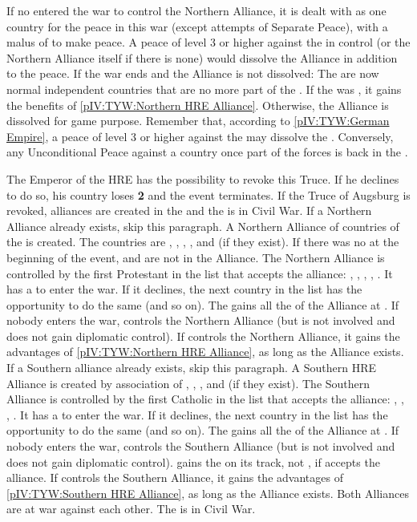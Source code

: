 \phpaix
\aparag If no \MAJ entered the war to control the Northern Alliance, it is
dealt with as one country for the peace in this war (except attempts of
Separate Peace), with a malus of  to make peace.
\aparag A peace of level 3 or higher against the \MAJ in control (or the
Northern Alliance itself if there is none) would dissolve the Alliance in
addition to the peace.
\aparag If the war ends and the Alliance is not dissolved:
\bparag The \MIN are now normal independent countries that are no more part of
the \GE.
\bparag If the \MAJ was \HOL, it gains the benefits of \ref{pIV:TYW:Northern
  HRE Alliance}. Otherwise, the Alliance is dissolved for game purpose.
\aparag Remember that, according to \ref{pIV:TYW:German Empire}, a peace of
level 3 or higher against the \MAJHAB may dissolve the \GE.  Conversely, any
Unconditional Peace against a country once part of the \GE forces is back in
the \GE.



\phevnt
\aparag The Emperor of the HRE has the possibility to revoke this Truce. If he
declines to do so, his country loses {\bf 2 \STAB} and the event terminates.
If the Truce of Augsburg is revoked, alliances are created in the \HRE and the
\HRE is in Civil War.
 If a Northern Alliance already exists, skip this
paragraph.
\bparag A Northern Alliance of countries of the \HRE is created.  The
countries are \paysOldenburg, \paysHanovre, \paysHesse, \paysHanse, and
\paysBerg (if they exist). If there was no  at the
beginning of the event,  and  are not in the Alliance.
\bparag The Northern Alliance is controlled by the first Protestant \MAJ in
the list that accepts the alliance: \HOL, \ENG, \SUE, \FRA, \POL.  It has a
\CB to enter the war. If it declines, the next country in the list has the
opportunity to do the same (and so on).  The \MAJ gains all the \MIN of the
Alliance at \EW.  If nobody enters the war, \SUE controls the Northern
Alliance (but is not involved and does not gain diplomatic control).
\bparag If \HOL controls the Northern Alliance, it gains the advantages of
\ref{pIV:TYW:Northern HRE Alliance}, as long as the Alliance exists.
 If a Southern alliance already exists, skip this
paragraph.
\bparag A Southern HRE Alliance is created by association of \paysBaviere,
\paysMayence, \paysAlsace, \paysBade and \paysWurtemberg (if they exist).
\bparag The Southern Alliance is controlled by the first Catholic \MAJ in the
list that accepts the alliance: \AUS, \SPA, \POL, \FRA.  It has a \CB to enter
the war. If it declines, the next country in the list has the opportunity to
do the same (and so on).  The \MAJ gains all the \MIN of the Alliance at \EW.
If nobody enters the war, \MAJHAB controls the Southern Alliance (but is not
involved and does not gain diplomatic control).
\bparag \AUSMin gains the \MIN on its track, not \SPA, if \SPA accepts the
alliance.
\bparag If \MAJHAB controls the Southern Alliance, it gains the advantages of
\ref{pIV:TYW:Southern HRE Alliance}, as long as the Alliance exists.
\aparag Both Alliances are at war against each other.  The \HRE is in Civil
War.

